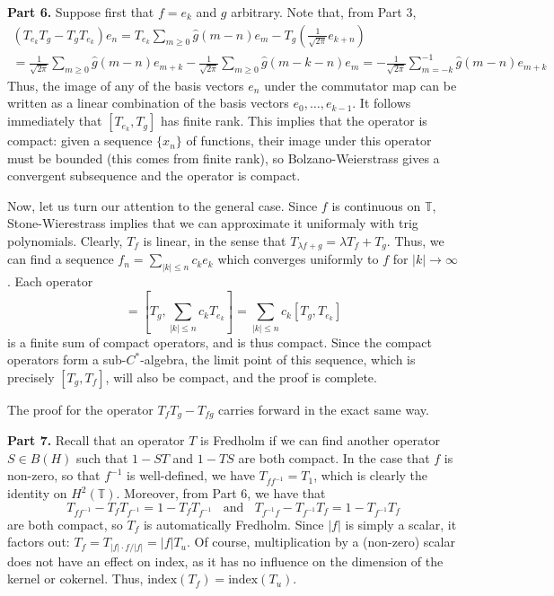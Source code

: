 \documentclass[aps,pra,showpacs,notitlepage,onecolumn,superscriptaddress,nofootinbib]{revtex4-1}
\theoremstyle{definition}
\begin{document}
\noindent \textbf{Part 6.} Suppose first that $f = e_k$ and $g$ arbitrary. Note that, from Part 3,
\begin{multline}
  (T_{e_k} T_g - T_g T_{e_k}) e_n = T_{e_k} \displaystyle\sum_{m \geq 0} \hat{g}(m - n) e_m - T_g \left( \frac{1}{\sqrt{2\pi}} e_{k + n} \right)
  \\ = \frac{1}{\sqrt{2\pi}} \displaystyle\sum_{m \geq 0} \hat{g}(m - n) e_{m + k} - \frac{1}{\sqrt{2\pi}} \displaystyle\sum_{m \geq 0} \hat{g}(m - k - n) e_{m} = -\frac{1}{\sqrt{2\pi}} \displaystyle\sum_{m = -k}^{-1} \hat{g}(m - n) e_{m + k}
\end{multline}
Thus, the image of any of the basis vectors $e_n$ under the commutator map can be written as a linear combination of the basis vectors $e_{0}, \dots, e_{k - 1}$. It follows immediately that $[T_{e_k}, T_g]$ has finite rank.
This implies that the operator is compact: given a sequence $\{x_n\}$ of functions, their image under this operator must be bounded (this comes from finite rank), so Bolzano-Weierstrass gives a convergent subsequence and the operator is compact.
\newline

\noindent Now, let us turn our attention to the general case. Since $f$ is continuous on $\mathbb{T}$, Stone-Wierestrass implies that we can approximate it uniformaly with trig polynomials. Clearly, $T_f$ is linear, in the sense
that $T_{\lambda f + g} = \lambda T_f + T_g$. Thus, we can find a sequence $f_n = \sum_{|k| \leq n} c_k e_k$ which converges uniformly to $f$ for $|k| \to \infty$. Each operator
\begin{equation}
  [T_g, T_{f_n}] = \left[ T_g, \sum_{|k| \leq n} c_k T_{e_k} \right] = \sum_{|k| \leq n} c_k [T_g, T_{e_k}]
\end{equation}
is a finite sum of compact operators, and is thus compact. Since the compact operators form a sub-$C^{*}$-algebra, the limit point of this sequence, which is precisely $[T_g, T_f]$, will also
be compact, and the proof is complete.
\newline

\noindent The proof for the operator $T_f T_g - T_{fg}$ carries forward in the exact same way.
\newline

\noindent \textbf{Part 7.} Recall that an operator $T$ is Fredholm if we can find another operator $S \in B(H)$ such that $1 - ST$ and $1 - TS$ are both compact.
In the case that $f$ is non-zero, so that $f^{-1}$ is well-defined, we have $T_{f f^{-1}} = T_1$, which is clearly the identity on $H^2(\mathbb{T})$. Moreover,
from Part 6, we have that
\begin{equation}
  T_{f f^{-1}} - T_{f} T_{f^{-1}} = 1 - T_f T_{f^{-1}} \ \ \ \ \text{and} \ \ \ \ T_{f^{-1} f} - T_{f^{-1}} T_f = 1 - T_{f^{-1}} T_f
\end{equation}
are both compact, so $T_f$ is automatically Fredholm. Since $|f|$ is simply a scalar, it factors out: $T_f = T_{|f| \cdot f/|f|} = |f| T_{u}$. Of course, multiplication
by a (non-zero) scalar does not have an effect on index, as it has no influence on the dimension of the kernel or cokernel. Thus, $\text{index}(T_f) = \text{index}(T_u)$.
\newline
\end{document}
